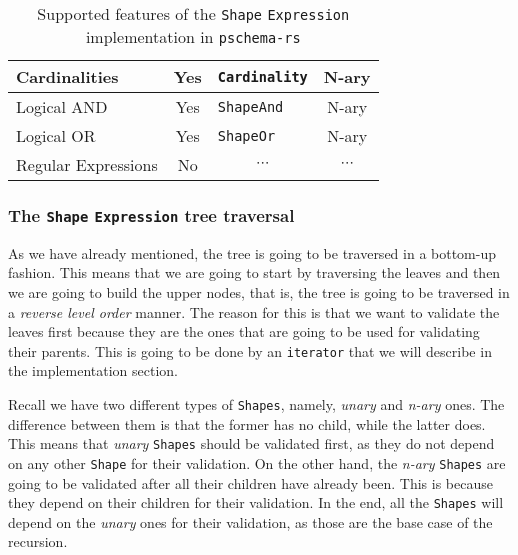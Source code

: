 \begin{table}[ht]
\begin{tabular}{|l|c|l|c|}
        Cardinalities                                                  & {\color[HTML]{009901} Yes} & \texttt{Cardinality}                                                         & N-ary                                                               \\ \hline
        Logical AND                                                    & {\color[HTML]{009901} Yes} & \texttt{ShapeAnd}                                                            & N-ary                                                               \\ \hline
        Logical OR                                                     & {\color[HTML]{009901} Yes} & \texttt{ShapeOr}                                                             & N-ary                                                               \\ \hline
        Regular Expressions                                            & {\color[HTML]{FE0000} No}  & \multicolumn{1}{c|}{$\cdots$}                                                & \multicolumn{1}{c|}{$\cdots$}                                       \\ \hline
    \end{tabular}
    \caption{Supported features of the \texttt{Shape} \texttt{Expression} implementation in \texttt{pschema-rs}}
    \label{table:shex-features}
\end{table}

\label{section:shape_expression_tree_traversal}
\subsubsection{The \texttt{Shape} \texttt{Expression} tree traversal}

As we have already mentioned, the tree is going to be traversed in a bottom-up fashion. This means that we are going to start by traversing the leaves and then we are going to build the upper nodes, that is, the tree is going to be traversed in a \textit{reverse level order} manner. The reason for this is that we want to validate the leaves first because they are the ones that are going to be used for validating their parents. This is going to be done by an \texttt{iterator} that we will describe in the implementation section.

Recall we have two different types of \texttt{Shapes}, namely, \textit{unary} and \textit{n-ary} ones. The difference between them is that the former has no child, while the latter does. This means that \textit{unary} \texttt{Shapes} should be validated first, as they do not depend on any other \texttt{Shape} for their validation. On the other hand, the \textit{n-ary} \texttt{Shapes} are going to be validated after all their children have already been. This is because they depend on their children for their validation. In the end, all the \texttt{Shapes} will depend on the \textit{unary} ones for their validation, as those are the base case of the recursion.

